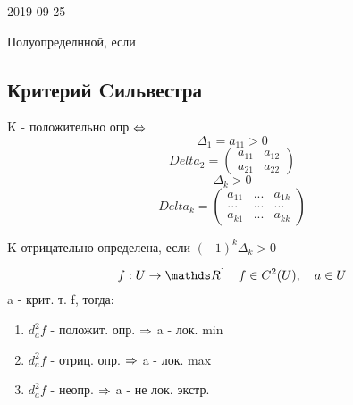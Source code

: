 \documentclass[main]{subfiles}
\begin{document}
\begin{lect} {2019-09-25}
\begin{Definition}
				Полуопределнной, если
		\end{Definition}

		\subsection{Критерий Cильвестра}
		K - положительно опр $\Leftrightarrow$
		\[\Delta_1=a_{1 1}>0\]
		\[Delta_2=\begin{pmatrix} %
				a_{11} & a_{12}\\
				a_{21} & a_{22}
		\end{pmatrix}\]
		\[\Delta_k>0\]
		\[Delta_k=\begin{pmatrix}
				a_{11} & ... & a_{1k}\\
				...& ... & ... \\
				a_{k1} &...& a_{kk}
		\end{pmatrix}\]

		K-отрицательно определена, если $(-1)^k \Delta_k>0$

		\begin{Theorem}
				\[f: U \ra \R^1 \q f \in C^2(U), \q a \in U\]
				a - крит. т. f, тогда:
				\begin{enumerate}
						\item $d_a^2 f$ - положит. опр. $\Rightarrow$ a - лок. min
						\item $d_a^2 f$ - отриц. опр. $\Rightarrow$ a - лок. max
						\item $d_a^2 f$ - неопр. $\Rightarrow$ a - не лок. экстр.
				\end{enumerate}
		\end{Theorem}

		\end{lect}
\end{document}
